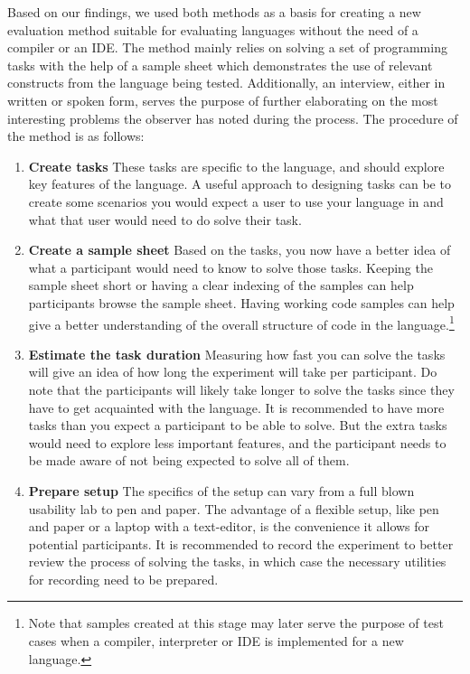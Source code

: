 \documentclass[preprint,10pt]{sigplanconf}
\begin{document}
Based on our findings, we used both methods as a basis for creating a new evaluation method suitable for evaluating languages without the need of a compiler or an IDE. The method mainly relies on solving a set of programming tasks with the help of a sample sheet which demonstrates the use of relevant constructs from the language being tested. Additionally, an interview, either in written or spoken form, serves the purpose of further elaborating on the most interesting problems the observer has noted during the process. The procedure of the method is as follows:

\begin{enumerate}
\item \textbf{Create tasks} These tasks are specific to the language, and should explore key features of the language. A useful approach to designing tasks can be to create some scenarios you would expect a user to use your language in and what that user would need to do solve their task.
\item \textbf{Create a sample sheet} Based on the tasks, you now have a better idea of what a participant would need to know to solve those tasks. Keeping the sample sheet short or having a clear indexing of the samples can help participants browse the sample sheet. Having working code samples can help give a better understanding of the overall structure of code in the language.\footnote{Note that samples created at this stage may later serve the purpose of test cases when a compiler, interpreter or IDE is implemented for a new language.}
\item \textbf{Estimate the task duration} Measuring how fast you can solve the tasks will give an idea of how long the experiment will take per participant. Do note that the participants will likely take longer to solve the tasks since they have to get acquainted with the language. It is recommended to have more tasks than you expect a participant to be able to solve. But the extra tasks would need to explore less important features, and the participant needs to be made aware of not being expected to solve all of them.
\item \textbf{Prepare setup} The specifics of the setup can vary from a full blown usability lab to pen and paper. The advantage of a flexible setup, like pen and paper or a laptop with a text-editor, is the convenience it allows for potential participants. It is recommended to record the experiment to better review the process of solving the tasks, in which case the necessary utilities for recording need to be prepared.

\end{enumerate}
\end{document}
